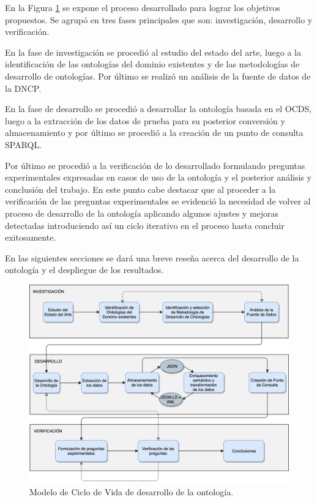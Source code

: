En la Figura \ref{img:materialesymetodos} se expone el proceso desarrollado para lograr los objetivos propuestos. Se agrupó en tres fases principales que son: investigación, desarrollo y verificación.

En la fase de investigación se procedió al estudio del estado del arte, luego a la identificación de las ontologías del dominio existentes y de las metodologías de desarrollo de ontologías. Por último se realizó un análisis de la fuente de datos de la DNCP.

En la fase de desarrollo se procedió a desarrollar la ontología basada en el OCDS, luego a la extracción de los datos de prueba para su posterior conversión y almacenamiento y por último se procedió a la creación de un punto de consulta SPARQL.

Por último se procedió a la verificación de lo desarrollado formulando preguntas experimentales expresadas en casos de uso de la ontología y el posterior análisis y conclusión del trabajo. En este punto cabe destacar que al proceder a la verificación de las preguntas experimentales se evidenció la necesidad de volver al proceso de desarrollo de la ontología aplicando algunos ajustes y mejoras detectadas introduciendo así un ciclo iterativo en el proceso hasta concluir exitosamente.


En las siguientes secciones se dará una breve reseña acerca del desarrollo de la ontología y el despliegue de los resultados. 

\begin{figure}[ht!]
    \centering
    \includegraphics[width=150mm]{figuras/Diagramas-MaterialesYMetrodos.png}
    \caption{Modelo de Ciclo de Vida de desarrollo de la ontología.}
    \label{img:materialesymetodos}
\end{figure}

